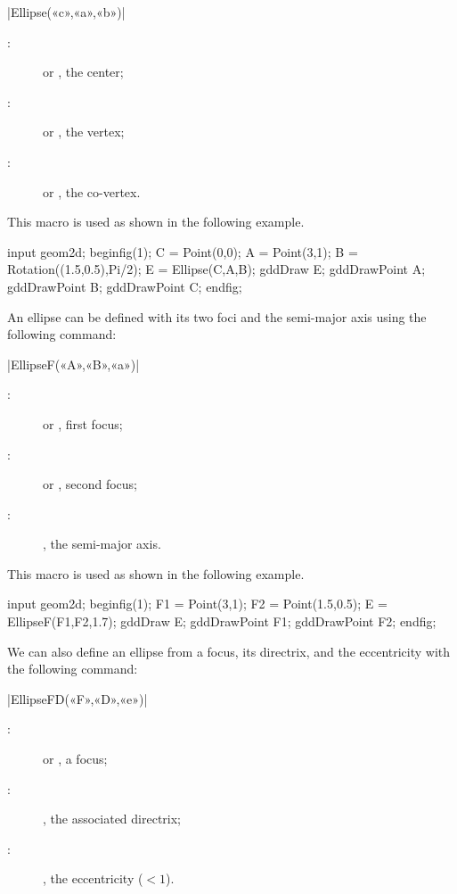 \documentclass[a4paper,english]{article}
\begin{document}
\begin{colourband}
\macro|Ellipse(«c»,«a»,«b»)|
\begin{description}
  \item[:]   or , the center;
  \item[:]   or , the vertex;
  \item[:]   or , the co-vertex.
\end{description}
\end{colourband}
\bigskip

This macro is used as shown in the following example.
\begin{ExempleMP}
input geom2d;
beginfig(1);
C = Point(0,0);
A = Point(3,1);
B = Rotation((1.5,0.5),Pi/2);
E = Ellipse(C,A,B);
gddDraw E;
gddDrawPoint A; gddDrawPoint B; gddDrawPoint C;
endfig;
\end{ExempleMP}

An ellipse can be defined with its two foci and the semi-major axis using the following command:
\begin{colourband}
\macro|EllipseF(«A»,«B»,«a»)|
\begin{description}
  \item[:]   or , first focus;
  \item[:]   or , second focus;
  \item[:]  , the semi-major axis.
\end{description}
\end{colourband}
\bigskip


This macro is used as shown in the following example.
\begin{ExempleMP}
input geom2d;
beginfig(1);
F1 = Point(3,1);
F2 = Point(1.5,0.5);
E = EllipseF(F1,F2,1.7);
gddDraw E;
gddDrawPoint F1; gddDrawPoint F2;
endfig;
\end{ExempleMP}

We can also define an ellipse from a focus, its directrix, and the eccentricity with the following command:
\begin{colourband}
\macro|EllipseFD(«F»,«D»,«e»)|
\begin{description}
  \item[:]   or , a focus;
  \item[:]  , the associated directrix;
  \item[:]  , the eccentricity ($<1$).
\end{description}
\end{colourband}
\bigskip
\end{document}
